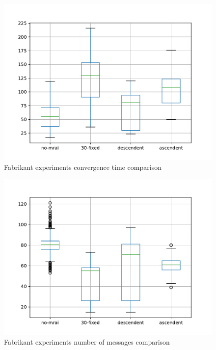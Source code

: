 \documentclass[10pt,conference,letterpaper]{IEEEtran}
\newcommand{\figwidth}{0.78}
\newcommand{\figvspace}{-1.5em}
\begin{document}
\begin{figure}[tb]
	\centering
	\includegraphics[width=\figwidth\columnwidth]{images/fabrikant/convergence_time}
	\caption{Fabrikant experiments convergence time comparison}
	\label{fig:fabr_conv_time_comp}
	\vspace{\figvspace}
\end{figure}

\begin{figure}[tb]
	\centering
	\includegraphics[width=\figwidth\columnwidth]{images/fabrikant/messages_comparison}
	\caption{Fabrikant experiments number of messages comparison}
	\label{fig:fabr_msg_comp}
	\vspace{\figvspace}
\end{figure}
\end{document}
